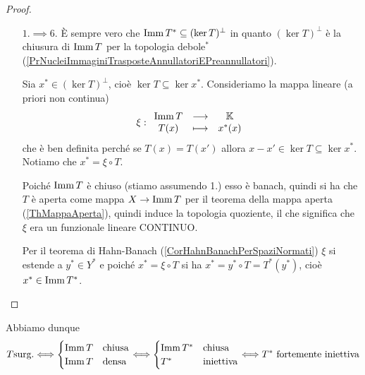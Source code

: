 \begin{proof}
\begin{itemize}
Per costruzione $\imm S$ \`e densa in $Z$ e la tesi \`e $S$ surgettiva. Dualizzando la successione
\[\begin{tikzcd}
	& Z \\
	X && Y
	\arrow[hook, from=1-2, to=2-3]
	\arrow["S", from=2-1, to=1-2]
	\arrow["T"', from=2-1, to=2-3]
\end{tikzcd}\]
troviamo
\[\begin{tikzcd}
	& {Z^\ast} \\
	{Y^\ast} && {X^\ast}
	\arrow["{S^\ast}", from=1-2, to=2-3]
	\arrow[from=2-1, to=1-2]
	\arrow["{T^\ast}"', from=2-1, to=2-3]
\end{tikzcd}\]
dove la mappa $Y^\ast\to Z^\ast$ \`e la restrizione del dominio, che \`e surgettiva per il teorema di Hahn-Banach (\ref{CorHahnBanachPerSpaziNormati}), dunque $S^\ast(Z)=T^\ast(Y)$. Notiamo che $T^\ast(Y)$ \`e chiuso in norma, quindi anche $S^\ast(Z)$ lo \`e. Poich\'e $\imm S$ \`e densa, $S^\ast$ \`e iniettiva, quindi per la caratterizzazione (\ref{ThSurgettivitaEAggiunti}) $S^\ast$ \`e fortemente iniettivo e perci\`o $S$ \`e surgettivo.
\item[$\boxed{1.\implies6.}$] \`E sempre vero che $\operatorname{Imm} T^\ast\subseteq (\ker T)^\perp$ in quanto $(\ker T)^\perp$ \`e la chiusura di $\operatorname{Imm} T$ per la topologia debole$^\ast$ (\ref{PrNucleiImmaginiTrasposteAnnullatoriEPreannullatori}).

Sia $x^\ast\in (\ker T)^\perp$, cio\`e $\ker T\subseteq \ker x^\ast$. Consideriamo la mappa lineare (a priori non continua)
\[\xi:\begin{array}{ccc} {\operatorname{Imm}T} & \longrightarrow & {\mathbb{K}}\\ {T(x)} & \longmapsto & {x^\ast(x)} \end{array}\]
che \`e ben definita perch\'e se $T(x)=T(x')$ allora $x-x'\in \ker T\subseteq \ker x^\ast$. Notiamo che $x^\ast=\xi\circ T$.

Poich\'e $\operatorname{Imm} T$ \`e chiuso (stiamo assumendo 1.) esso \`e banach, quindi si ha che $T$ \`e aperta come mappa $X\to \operatorname{Imm} T$ per il teorema della mappa aperta (\ref{ThMappaAperta}), quindi induce la topologia quoziente, il che significa che $\xi$ era un funzionale lineare CONTINUO.

Per il teorema di Hahn-Banach (\ref{CorHahnBanachPerSpaziNormati}) $\xi$ si estende a $y^\ast\in Y^\ast$ e poich\'e $x^\ast=\xi\circ T$ si ha $x^\ast=y^\ast\circ T=T^\ast(y^\ast)$, cio\`e $x^\ast\in \operatorname{Imm} T^\ast$.
\end{itemize}
\setlength{\leftmargini}{0.5cm}
\end{proof}

Abbiamo dunque
\[T\text{surg.}\Longleftrightarrow \begin{cases}
    \operatorname{Imm} T&\text{chiusa}\\
    \operatorname{Imm} T&\text{densa}
\end{cases} \Longleftrightarrow \begin{cases}
    \operatorname{Imm} T^\ast&\text{chiusa}\\
    T^\ast&\text{iniettiva}
\end{cases}\Longleftrightarrow T^\ast\text{ fortemente iniettiva}\]



